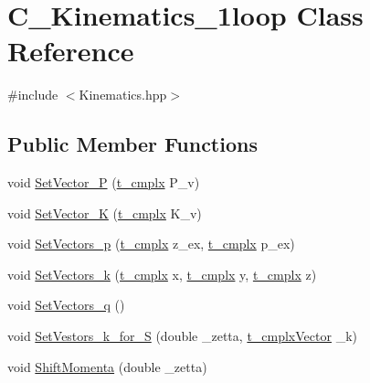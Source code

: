 \hypertarget{class_c___kinematics__1loop}{\section{C\-\_\-\-Kinematics\-\_\-1loop Class Reference}
\label{class_c___kinematics__1loop}
}


{\ttfamily \#include $<$Kinematics.\-hpp$>$}

\subsection*{Public Member Functions}
\begin{DoxyCompactItemize}
\item 
void \hyperlink{class_c___kinematics__1loop_ac8ea5c0bc49a996a39f5d9bb9be77938}{Set\-Vector\-\_\-\-P} (\hyperlink{types_8h_aa75ae339052372f671bb263e6a272e82}{t\-\_\-cmplx} P\-\_\-v)
\item 
void \hyperlink{class_c___kinematics__1loop_a19d01bd7b6d4823e432fe4b6e93bb5cb}{Set\-Vector\-\_\-\-K} (\hyperlink{types_8h_aa75ae339052372f671bb263e6a272e82}{t\-\_\-cmplx} K\-\_\-v)
\item 
void \hyperlink{class_c___kinematics__1loop_af2e051a57be7c9f8b4f82c9c8075f66f}{Set\-Vectors\-\_\-p} (\hyperlink{types_8h_aa75ae339052372f671bb263e6a272e82}{t\-\_\-cmplx} z\-\_\-ex, \hyperlink{types_8h_aa75ae339052372f671bb263e6a272e82}{t\-\_\-cmplx} p\-\_\-ex)
\item 
void \hyperlink{class_c___kinematics__1loop_aba1b23f38eab08828d0090e0e7411bd6}{Set\-Vectors\-\_\-k} (\hyperlink{types_8h_aa75ae339052372f671bb263e6a272e82}{t\-\_\-cmplx} x, \hyperlink{types_8h_aa75ae339052372f671bb263e6a272e82}{t\-\_\-cmplx} y, \hyperlink{types_8h_aa75ae339052372f671bb263e6a272e82}{t\-\_\-cmplx} z)
\item 
void \hyperlink{class_c___kinematics__1loop_aa93f0b39da69100d1801a9d525b65fff}{Set\-Vectors\-\_\-q} ()
\item 
void \hyperlink{class_c___kinematics__1loop_a9d78b3129c3eefedb197f1fd13c341e7}{Set\-Vestors\-\_\-k\-\_\-for\-\_\-\-S} (double \-\_\-zetta, \hyperlink{types_8h_ae8d0d77d0edff801ba45e425c85cf87d}{t\-\_\-cmplx\-Vector} \-\_\-k)
\item 
void \hyperlink{class_c___kinematics__1loop_aaa11f269ac21aecf200909d0396ab3cd}{Shift\-Momenta} (double \-\_\-zetta)
\end{DoxyCompactItemize}
